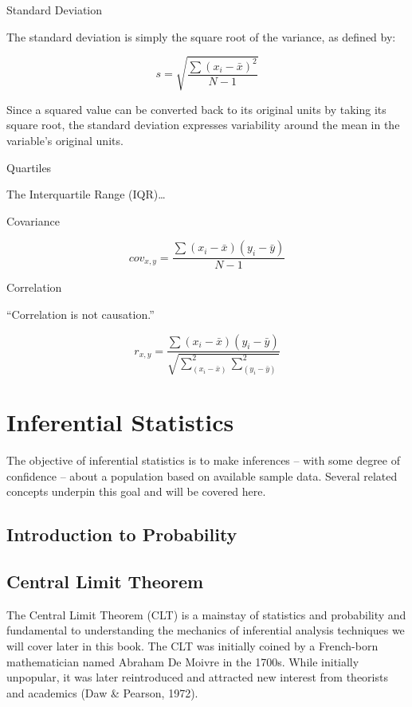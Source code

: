 \documentclass[]{book}
\begin{document}
Standard Deviation

The standard deviation is simply the square root of the variance, as defined by:

\[ s = \sqrt{\frac{\sum (x_{i} - \bar{x})^{2}}{N - 1}} \]

Since a squared value can be converted back to its original units by taking its square root, the standard deviation expresses variability around the mean in the variable's original units.

Quartiles

The Interquartile Range (IQR)\ldots{}

Covariance

\[ cov_{x,y} = \frac{\sum(x_{i}-\bar{x})(y_{i}-\bar{y})}{N-1} \]

Correlation

``Correlation is not causation.''

\[ r_{x,y} = \frac{\sum(x_{i}-\bar{x})(y_{i}-\bar{y})}{\sqrt{\sum_(x_{i}-\bar{x})^2\sum_(y_{i}-\bar{y})^2}} \]

\hypertarget{inferential-statistics}{%
\section{Inferential Statistics}\label{inferential-statistics}}

The objective of inferential statistics is to make inferences -- with some degree of confidence -- about a population based on available sample data. Several related concepts underpin this goal and will be covered here.

\hypertarget{introduction-to-probability}{%
\subsection{Introduction to Probability}\label{introduction-to-probability}}

\hypertarget{central-limit-theorem}{%
\subsection{Central Limit Theorem}\label{central-limit-theorem}}

The Central Limit Theorem (CLT) is a mainstay of statistics and probability and fundamental to understanding the mechanics of inferential analysis techniques we will cover later in this book. The CLT was initially coined by a French-born mathematician named Abraham De Moivre in the 1700s. While initially unpopular, it was later reintroduced and attracted new interest from theorists and academics (Daw \& Pearson, 1972).
\end{document}
